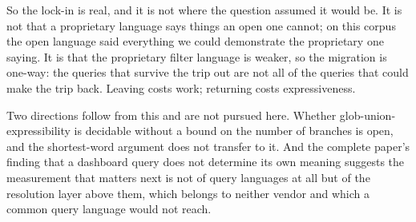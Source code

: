 So the lock-in is real, and it is not where the question assumed it would be. It is not
that a proprietary language says things an open one cannot; on this corpus the open
language said everything we could demonstrate the proprietary one saying. It is that the
proprietary filter language is weaker, so the migration is one-way: the queries that
survive the trip out are not all of the queries that could make the trip back. Leaving
costs work; returning costs expressiveness.

Two directions follow from this and are not pursued here. Whether glob-union-expressibility
is decidable without a bound on the number of branches is open, and the shortest-word
argument does not transfer to it. And the complete paper's finding that a dashboard query
does not determine its own meaning suggests the measurement that matters next is not of
query languages at all but of the resolution layer above them, which belongs to neither
vendor and which a common query language would not reach.
